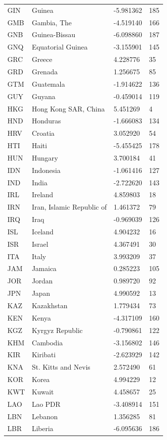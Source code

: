 \begin{tabular}{llll}
GIN & Guinea & -5.981362 & 185 \\
GMB & Gambia, The & -4.519140 & 166 \\
GNB & Guinea-Bissau & -6.098860 & 187 \\
GNQ & Equatorial Guinea & -3.155901 & 145 \\
GRC & Greece & 4.228776 & 35 \\
GRD & Grenada & 1.256675 & 85 \\
GTM & Guatemala & -1.914622 & 136 \\
GUY & Guyana & -0.459014 & 119 \\
HKG & Hong Kong SAR, China & 5.451269 & 4 \\
HND & Honduras & -1.666083 & 134 \\
HRV & Croatia & 3.052920 & 54 \\
HTI & Haiti & -5.455425 & 178 \\
HUN & Hungary & 3.700184 & 41 \\
IDN & Indonesia & -1.061416 & 127 \\
IND & India & -2.722620 & 143 \\
IRL & Ireland & 4.859803 & 18 \\
IRN & Iran, Islamic Republic of & 1.461372 & 79 \\
IRQ & Iraq & -0.969039 & 126 \\
ISL & Iceland & 4.904232 & 16 \\
ISR & Israel & 4.367491 & 30 \\
ITA & Italy & 3.993209 & 37 \\
JAM & Jamaica & 0.285223 & 105 \\
JOR & Jordan & 0.989720 & 92 \\
JPN & Japan & 4.990592 & 13 \\
KAZ & Kazakhstan & 1.779434 & 73 \\
KEN & Kenya & -4.317109 & 160 \\
KGZ & Kyrgyz Republic & -0.790861 & 122 \\
KHM & Cambodia & -3.156802 & 146 \\
KIR & Kiribati & -2.623929 & 142 \\
KNA & St. Kitts and Nevis & 2.572490 & 61 \\
KOR & Korea & 4.994229 & 12 \\
KWT & Kuwait & 4.458657 & 25 \\
LAO & Lao PDR & -3.408914 & 151 \\
LBN & Lebanon & 1.356285 & 81 \\
LBR & Liberia & -6.095636 & 186 \\

\end{tabular}
